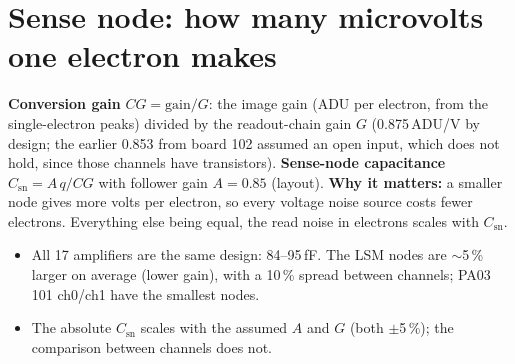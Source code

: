 \documentclass[10pt]{article}
\newcommand{\what}[1]{\par\colorbox{boxbg}{\parbox{\dimexpr\linewidth-2\fboxsep}{\small #1}}\par}
\begin{document}
\clearpage
\section{Sense node: how many microvolts one electron makes}
\what{\textbf{Conversion gain} $CG=\text{gain}/G$: the image gain (ADU per electron, from the single-electron peaks)
divided by the readout-chain gain $G$ (0.875\,ADU/\textmu V by design; the earlier 0.853 from board 102 assumed an open input, which does not hold,
since those channels have transistors). \textbf{Sense-node capacitance} $C_\text{sn}=A\,q/CG$ with follower gain $A=0.85$ (layout).
\textbf{Why it matters:} a smaller node gives more volts per electron, so every voltage noise source costs fewer
electrons. Everything else being equal, the read noise in electrons scales with $C_\text{sn}$.}

\begin{itemize}[nosep]
\item All 17 amplifiers are the same design: 84--95\,fF. The LSM nodes are $\sim$5\,\% larger on average (lower gain),
  with a 10\,\% spread between channels; PA03 101 ch0/ch1 have the smallest nodes.
\item The absolute $C_\text{sn}$ scales with the assumed $A$ and $G$ (both $\pm$5\,\%); the comparison between channels does not.
\end{itemize}

\end{document}
